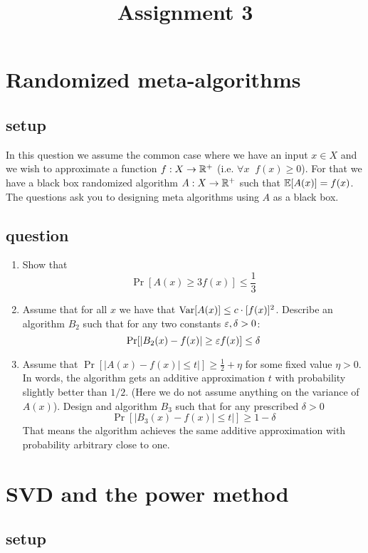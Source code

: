 \documentclass{article}
\title{Assignment 3} %
\begin{document}
\date{\nonumber}
\maketitle

\section{Randomized meta-algorithms}
\subsection*{setup}
In this question we assume the common case where we have an input $x \in X$  
and we wish to approximate a function $f:X \rightarrow {\mathbb{R}}^+$ (i.e. $\forall x\;\;f(x) \ge 0$).
For that we have a black box randomized algorithm $A:X\rightarrow {\mathbb{R}}^+$ such that ${\mathbb E}[A(x)] = f(x)$.
The questions ask you to designing meta algorithms using $A$ as a black box. 
\subsection*{question}
\begin{enumerate}
\item Show that
\[
\Pr[A(x) \ge 3f(x)] \le \frac{1}{3}
\]
\item Assume that for all $x$ we have that ${\operatorname{Var}}[A(x)] \le c\cdot [f(x)]^2$.
Describe an algorithm $B_2$ such that for any two constants $\varepsilon,\delta > 0$:
\[
\Pr[|B_2(x) - f(x)| \ge \varepsilon f(x)] \le \delta
\]
\item Assume that $\Pr[|A(x) - f(x) | \le t|] \ge \frac{1}{2}+\eta$ for some fixed value $\eta > 0$.
In words, the algorithm gets an additive approximation $t$ with probability slightly better than $1/2$.
(Here we do not assume anything on the variance of $A(x)$).
Design and algorithm $B_3$ such that for any prescribed $\delta >0$
\[
\Pr[|B_3(x) - f(x) | \le t|] \ge 1 - \delta
\]
That means the algorithm achieves the same additive approximation with probability arbitrary close to one.
\end{enumerate}

\pagebreak
\section{SVD and the power method}
\subsection*{setup}
\end{document}
